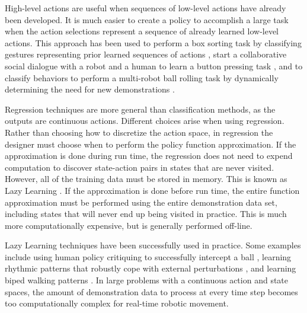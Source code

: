 \documentclass{article}
\begin{document}
High-level actions are useful when sequences of low-level actions have already been developed. It is much easier to create a policy to accomplish a large task when the action selections represent a sequence of already learned low-level actions. This approach has been used to perform a box sorting task by classifying gestures representing prior learned sequences of actions \cite{770051}, start a collaborative social dialogue with a robot and a human to learn a button pressing task \cite{1389954}, and to classify behaviors to perform a multi-robot ball rolling task by dynamically determining the need for new demonstrations \cite{Chernova:2008:TMC:1402821.1402826}.

Regression techniques are more general than classification methods, as the outputs are continuous actions. Different choices arise when using regression. Rather than choosing how to discretize the action space, in regression the designer must choose when to perform the policy function approximation. If the approximation is done during run time, the regression does not need to expend computation to discover state-action pairs in states that are never visited. However, all of the training data must be stored in memory. This is known as Lazy Learning \cite{Atkeson97locallyweighted}. If the approximation is done before run time, the entire function approximation must be performed using the entire demonstration data set, including states that will never end up being visited in practice. This is much more computationally expensive, but is generally performed off-line.

Lazy Learning techniques have been successfully used in practice. Some examples include using human policy critiquing to successfully intercept a ball \cite{Argall:2007:LDC:1228716.1228725}, learning rhythmic patterns that robustly cope with external perturbations \cite{Ijspeert02learningrhythmic}, and learning biped walking patterns \cite{Nakanishi04learningfrom}. In large problems with a continuous action and state spaces, the amount of demonstration data to process at every time step becomes too computationally complex for real-time robotic movement.
\end{document}
